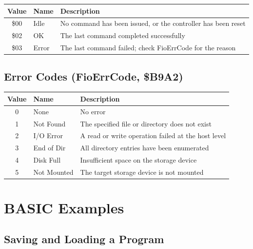 \begin{center}
\small
\begin{tabular}{@{}clp{8cm}@{}}
\toprule
\textbf{Value} & \textbf{Name} & \textbf{Description} \\
\midrule
\$00 & Idle  & No command has been issued, or the controller has been reset \\
\$02 & OK    & The last command completed successfully \\
\$03 & Error & The last command failed; check FioErrCode for the reason \\
\bottomrule
\end{tabular}
\end{center}

\subsection{Error Codes (FioErrCode, \$B9A2)}

\begin{center}
\small
\begin{tabular}{@{}clp{8cm}@{}}
\toprule
\textbf{Value} & \textbf{Name} & \textbf{Description} \\
\midrule
0 & None       & No error \\
1 & Not Found  & The specified file or directory does not exist \\
2 & I/O Error  & A read or write operation failed at the host level \\
3 & End of Dir & All directory entries have been enumerated \\
4 & Disk Full  & Insufficient space on the storage device \\
5 & Not Mounted & The target storage device is not mounted \\
\bottomrule
\end{tabular}
\end{center}


\section{BASIC Examples}
\label{sec:fio-examples}

\subsection{Saving and Loading a Program}

